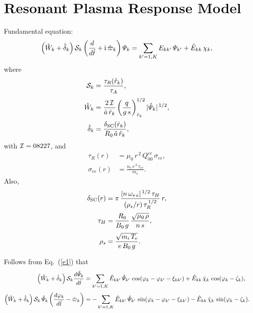 \documentclass[12pt]{article}
\begin{document}
\section{Resonant Plasma Response Model}
Fundamental equation:
\begin{equation}\label{e1}
\left(\hat{W}_k +\hat{\delta}_k\right){\cal S}_k\left(\frac{d}{d\hat{t}} + {\rm i}\,\hat{\varpi}_k\right){\mit\Psi}_k = \sum_{k'=1,K}E_{kk'}\,{\mit\Psi}_{k'}
+ \hat{E}_{kk}\,\chi_k,
\end{equation}
where
\begin{align}
{\cal S}_k&=\frac{\tau_R(\hat{r}_k)}{\tau_A},\\[0.5ex]
\hat{W}_k &=\frac{2\,{\cal I}}{\hat{a}\,\hat{r}_k}\left(\frac{q}{g\,s}\right)_{\hat{r}_k}^{1/2} |\hat{\mit\Psi}_k|^{\,1/2},\\[0.5ex]
\hat{\delta}_k &= \frac{\delta_{\rm SC}(\hat{r}_k)}{R_0\,\hat{a}\,\hat{r}_k},
\end{align}
with ${\cal I}=08227$, and
\begin{align}
\tau_R(r) &= \mu_0\,r^{\,2}\,Q_{00}^{ee}\,\sigma_{ee},\\[0.5ex]
\sigma_{ee}(r) &=\frac{n_e\,e^{\,2}\,\tau_{ee}}{m_e}.
\end{align}
Also,
\begin{align}
\delta_{\rm SC}(r)& = \pi \,\frac{|n\,\omega_{\ast\,e}|^{\,1/2}\,\tau_H}{(\rho_s/r)\,\tau_R^{\,1/2}}\,r,\\[0.5ex]
\tau_H &= \frac{R_0}{B_0\,g}\,\frac{\sqrt{\mu_0\,\rho}}{n\,s},\\[0.5ex]
\rho_s &= \frac{\sqrt{m_i\,T_e}}{e\,B_0\,g}.
\end{align}

Follows from Eq.~(\ref{e1}) that
\begin{align}
\left(\hat{W}_k +\hat{\delta}_k\right){\cal S}_k\frac{d\hat{\mit\Psi}_k}{d\hat{t}}&= \sum_{k'=1,K}\hat{E}_{kk'}\,\hat{\mit\Psi}_{k'}\,\cos(\varphi_k-\varphi_{k'}-\xi_{kk'})
+ \hat{E}_{kk}\,\hat{\chi}_k\,\cos(\varphi_k-\zeta_k),\\[0.5ex]
\left(\hat{W}_k +\hat{\delta}_k\right){\cal S}_k\,\hat{\mit\Psi}_k\left(\frac{d\varphi_k}{d\hat{t}}-\hat{\varpi}_k\right)&=- \sum_{k'=1,K}\hat{E}_{kk'}\,\hat{\mit\Psi}_{k'}\,\sin(\varphi_k-\varphi_{k'}-\xi_{kk'})-
 \hat{E}_{kk}\,\hat{\chi}_k\,\sin(\varphi_k-\zeta_k).
\end{align}
\end{document}
